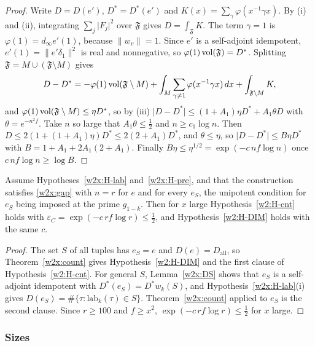 \begin{proof}
Write $D=D(e')$, $D^*=D^*(e')$ and $K(x)=\sum_\gamma\varphi(x^{-1}\gamma x)$. By (i) and (ii), integrating $\sum_j\lvert F_j\rvert^2$ over $\mathfrak F$ gives $D=\int_{\mathfrak F}K$. The term $\gamma=1$ is $\varphi(1)=d_\infty e'(1)$, because $\lVert w_v\rVert=1$. Since $e'$ is a self-adjoint idempotent, $e'(1)=\lVert e'\delta_1\rVert^2$ is real and nonnegative, so $\varphi(1)\operatorname{vol}(\mathfrak F)=D^*$. Splitting $\mathfrak F=M\cup(\mathfrak F\setminus M)$ gives
\[
D-D^*=-\varphi(1)\operatorname{vol}(\mathfrak F\setminus M)+\int_M\sum_{\gamma\ne1}\varphi(x^{-1}\gamma x)\,dx+\int_{\mathfrak F\setminus M}K,
\]
and $\varphi(1)\operatorname{vol}(\mathfrak F\setminus M)\le\eta D^*$, so by (iii) $\lvert D-D^*\rvert\le(1+A_1)\eta D^*+A_1\theta D$ with $\theta=e^{-n^2f}$. Take $n$ so large that $A_1\theta\le\frac12$ and $n\ge c_1\log n$. Then $D\le2(1+(1+A_1)\eta)D^*\le2(2+A_1)D^*$, and $\theta\le\eta$, so $\lvert D-D^*\rvert\le B\eta D^*$ with $B=1+A_1+2A_1(2+A_1)$. Finally $B\eta\le\eta^{1/2}=\exp(-c\,nf\log n)$ once $c\,nf\log n\ge\log B$.
\end{proof}

\begin{corollary}\label{w2x:cnt}
Assume Hypotheses~\ref{w2x:H-lab} and~\ref{w2x:H-pre}, and that the construction satisfies \eqref{w2x:gap} with $n=r$ for $e$ and for every $e_S$, the unipotent condition for $e_S$ being imposed at the prime $g_{1-k}$. Then for $x$ large Hypothesis~\ref{w2:H-cnt} holds with $\varepsilon_C=\exp(-c\,rf\log r)\le\frac12$, and Hypothesis~\ref{w2:H-DIM} holds with the same $c$.
\end{corollary}

\begin{proof}
The set $S$ of all tuples has $e_S=e$ and $D(e)=D_{\mathrm{all}}$, so Theorem~\ref{w2x:count} gives Hypothesis~\ref{w2:H-DIM} and the first clause of Hypothesis~\ref{w2:H-cnt}. For general $S$, Lemma~\ref{w2x:DS} shows that $e_S$ is a self-adjoint idempotent with $D^*(e_S)=D^*w_k(S)$, and Hypothesis~\ref{w2x:H-lab}(i) gives $D(e_S)=\#\{\tau:\mathrm{lab}_k(\tau)\in S\}$. Theorem~\ref{w2x:count} applied to $e_S$ is the second clause. Since $r\ge100$ and $f\ge x^2$, $\exp(-c\,rf\log r)\le\frac12$ for $x$ large.
\end{proof}

\subsubsection{Sizes}\label{w2x:sec:sizes}

